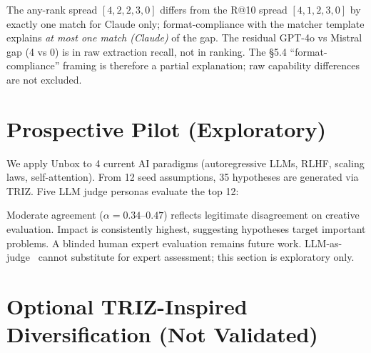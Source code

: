 \documentclass[11pt]{article}
\begin{document}
The any-rank spread $[4, 2, 2, 3, 0]$ differs from the R@10 spread $[4, 1, 2, 3, 0]$ by exactly one match for Claude only; format-compliance with the matcher template explains \emph{at most one match (Claude)} of the gap. The residual GPT-4o vs Mistral gap (4 vs 0) is in raw extraction recall, not in ranking. The §5.4 ``format-compliance'' framing is therefore a partial explanation; raw capability differences are not excluded.

\section{Prospective Pilot (Exploratory)}\label{app:prospective}

We apply Unbox to 4 current AI paradigms (autoregressive LLMs, RLHF, scaling laws, self-attention). From 12 seed assumptions, 35 hypotheses are generated via TRIZ. Five LLM judge personas evaluate the top 12:

\begin{table}[h]
\centering
\caption{Prospective pilot (5 LLM judge personas, top-12 hypotheses). Moderate inter-judge agreement ($\alpha = 0.34$--$0.47$) reflects legitimate disagreement on creative evaluation; this section is exploratory only.}
\label{tab:prospective}
\footnotesize
\setlength{\tabcolsep}{4pt}
\end{table}

Moderate agreement ($\alpha = 0.34$--$0.47$) reflects legitimate disagreement on creative evaluation. Impact is consistently highest, suggesting hypotheses target important problems. A blinded human expert evaluation remains future work. LLM-as-judge~\cite{zheng2023judging} cannot substitute for expert assessment; this section is exploratory only.

\section{Optional TRIZ-Inspired Diversification (Not Validated)}\label{app:triz}
\end{document}
